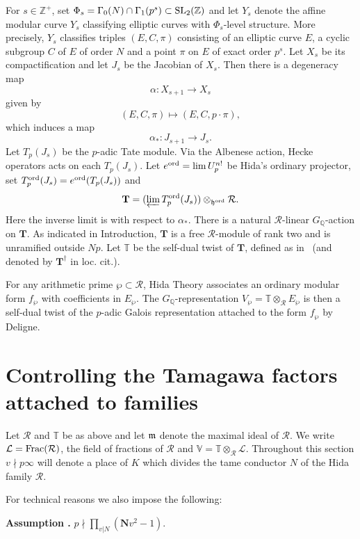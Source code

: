 \documentclass[12pt]{amsart}
\numberwithin{equation}{section}
\newenvironment{assume}{\par\medskip\noindent\refstepcounter{thm}
\bgroup{\hspace*{-0.15 cm}\bf{Assumption}
\thethm.}\bgroup}{\egroup \egroup\par\medskip}
\begin{document}
For $s \in {\mathbb{Z}}^+$, set $\Phi_s=\Gamma_0(N)\cap \Gamma_1(p^s) \subset \textup{SL}_2({\mathbb{Z}})$ and let $Y_s$ denote the affine modular curve $Y_s$ classifying elliptic curves with $\Phi_s$-level structure. More precisely, $Y_s$ classifies triples $(E,C,\pi)$ consisting of an elliptic curve $E$, a cyclic subgroup $C$ of $E$ of order $N$ and a point $\pi$ on $E$ of exact order $p^s$. Let $X_s$ be its compactification and let $J_s$ be the Jacobian of $X_s$. Then there is a degeneracy map
$$\alpha: X_{s+1}{\longrightarrow} X_s$$
given by
$$(E,C,\pi) \mapsto (E,C,p\cdot\pi),$$
which induces a map
$$\alpha_*:J_{s+1}{\longrightarrow} J_s.$$
Let $T_p(J_s)$ be the $p$-adic Tate module. Via the Albenese action, Hecke operators acts on each  $T_p(J_s)$. Let $e^{\textup{ord}}=\lim U_p^{n!}$ be Hida's ordinary projector, set $T_p^{\textup{ord}}(J_s)=e^{\textup{ord}}(T_p(J_s))$ and
$$\mathbf{T}=(\varprojlim T_p^{\textup{ord}}(J_s))\otimes_{\frak{h}^{\textup{ord}}} \mathcal{R}.$$
Here the inverse limit is with respect to $\alpha_*$. There is a natural $\mathcal{R}$-linear $G_{\mathbb{Q}}$-action on $\mathbf{T}$. As indicated in Introduction, $\mathbf{T}$ is a free $\mathcal{R}$-module of rank two and is unramified outside $Np$. Let ${\mathbb{T}}$ be the self-dual twist of $\mathbf{T}$, defined as in~\cite[Definition 2.1.3]{howard} (and denoted by $\mathbf{T}^\dagger$ in loc. cit.).

For any arithmetic prime $\wp\subset \mathcal{R}$, Hida Theory associates an ordinary modular form $f_\wp$ with coefficients in $E_\wp$. The $G_{\mathbb{Q}}$-representation $V_\wp={\mathbb{T}}\otimes_{\mathcal{R}} E_{\wp}$ is then a self-dual twist of the $p$-adic Galois representation attached to the form $f_\wp$ by Deligne.
\section{Controlling the Tamagawa factors attached to families}
\label{sec:tamcontrol}
 Let ${\mathcal{R}}$ and ${\mathbb{T}}$ be as above and let $\frak{m}$ denote the maximal ideal of ${\mathcal{R}}$. We write
${\mathcal{L}}=\textup{Frac}({\mathcal{R}})$, the field of fractions of ${\mathcal{R}}$ and
${\mathbb{V}}={\mathbb{T}}\otimes_{\mathcal{R}}{\mathcal{L}}$. Throughout this section $v \nmid p\infty$  will
denote a place of $K$ which divides the tame conductor $N$ of
the Hida family ${\mathcal{R}}$.

For technical reasons we also impose the following:
\begin{assume}
\label{assume:p} $\displaystyle{p \nmid \prod_{v|N} (\mathbf{N}v^2-1).}$
\end{assume}
\end{document}

